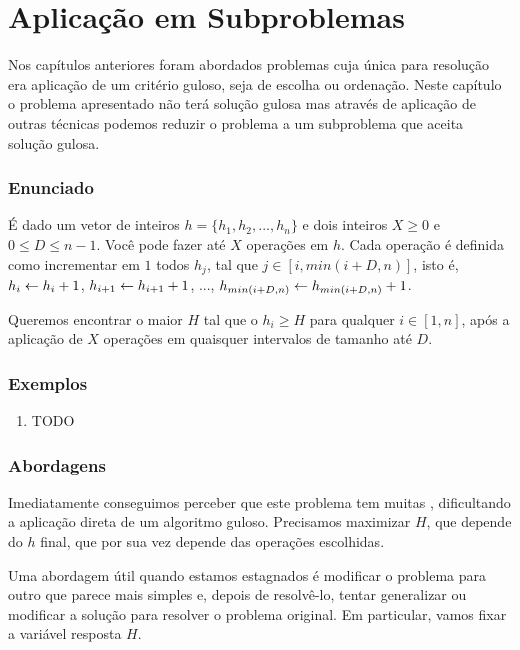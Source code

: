 \chapter{Aplicação em Subproblemas}
\label{subproblema}

Nos capítulos anteriores foram abordados problemas cuja única para resolução era aplicação de um critério guloso, seja de escolha ou ordenação. Neste capítulo o problema apresentado não terá solução gulosa mas através de aplicação de outras técnicas podemos reduzir o problema a um subproblema que aceita solução gulosa.

\subsection*{Enunciado}

É dado um vetor de inteiros $h = \{h_1, h_2, ..., h_n\}$ e dois inteiros $X \geq 0$ e $0 \leq D \leq n - 1$. Você pode fazer até $X$ operações em $h$. Cada operação é definida como incrementar em $1$ todos $h_j$, tal que $j \in [i, min(i + D, n)]$, isto é, $h_i \leftarrow h_i + 1$, $h_{i + 1} \leftarrow h_{i + 1} + 1$, ..., $h_{min(i + D, n)} \leftarrow h_{min(i + D, n)} + 1$.

Queremos encontrar o maior $H$ tal que o $h_i \geq H$ para qualquer $i \in [1, n]$, após a aplicação de $X$ operações em quaisquer intervalos de tamanho até $D$.

\subsection*{Exemplos}

\begin{enumerate}
    \item TODO
\end{enumerate}

\subsection*{Abordagens}

Imediatamente conseguimos perceber que este problema tem muitas , dificultando a aplicação direta de um algoritmo guloso. Precisamos maximizar $H$, que depende do $h$ final, que por sua vez depende das operações escolhidas.

Uma abordagem útil quando estamos estagnados é modificar o problema para outro que parece mais simples e, depois de resolvê-lo, tentar generalizar ou modificar a solução para resolver o problema original. Em particular, vamos fixar a variável resposta $H$.

